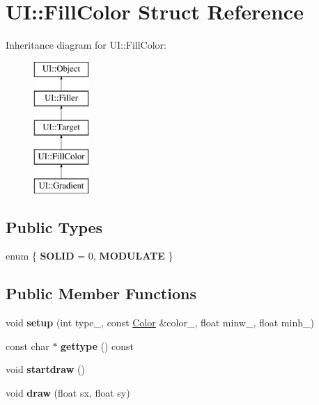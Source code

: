 \hypertarget{struct_u_i_1_1_fill_color}{}\section{UI\+:\+:Fill\+Color Struct Reference}
\label{struct_u_i_1_1_fill_color}
Inheritance diagram for UI\+:\+:Fill\+Color\+:\begin{figure}[H]
\begin{center}
\leavevmode
\includegraphics[height=5.000000cm]{struct_u_i_1_1_fill_color}
\end{center}
\end{figure}
\subsection*{Public Types}
\begin{DoxyCompactItemize}
\item 
\mbox{\label{struct_u_i_1_1_fill_color_a99546f7ba25a5e08d61dfd0947b18770}} 
enum \{ {\bfseries S\+O\+L\+ID} = 0, 
{\bfseries M\+O\+D\+U\+L\+A\+TE}
 \}
\end{DoxyCompactItemize}
\subsection*{Public Member Functions}
\begin{DoxyCompactItemize}
\item 
\mbox{\label{struct_u_i_1_1_fill_color_a4e1f42e2683e7f130bd18430a054821a}} 
void {\bfseries setup} (int type\+\_\+, const \hyperlink{struct_u_i_1_1_color}{Color} \&color\+\_\+, float minw\+\_, float minh\+\_)
\item 
\mbox{\label{struct_u_i_1_1_fill_color_a0d68b66b0e944e169a783896e0b46751}} 
const char $\ast$ {\bfseries gettype} () const
\item 
\mbox{\label{struct_u_i_1_1_fill_color_aa990063e614c544d7ba8e83908ce7de5}} 
void {\bfseries startdraw} ()
\item 
\mbox{\label{struct_u_i_1_1_fill_color_afdf249681ec6a5bb4b432909835b7256}} 
void {\bfseries draw} (float sx, float sy)
\end{DoxyCompactItemize}
